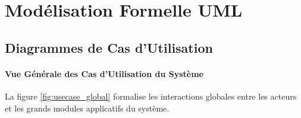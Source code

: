 \newpage
\section{Modélisation Formelle UML}

\subsection{Diagrammes de Cas d'Utilisation}

\paragraph{Vue Générale des Cas d'Utilisation du Système}
La figure \ref{fig:usecase_global} formalise les interactions globales entre les acteurs et les grands modules applicatifs du système.

